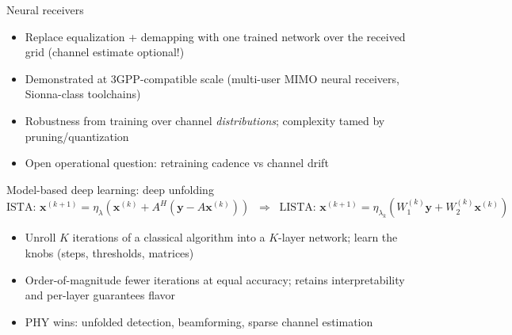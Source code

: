 \begin{frame}{Neural receivers}
  \begin{itemize}\itemsep2pt
    \item Replace equalization + demapping with one trained network over the
          received grid (channel estimate optional!)
    \item Demonstrated at 3GPP-compatible scale (multi-user MIMO neural
          receivers, Sionna-class toolchains)
    \item Robustness from training over channel \emph{distributions};
          complexity tamed by pruning/quantization
    \item Open operational question: retraining cadence vs channel drift
  \end{itemize}
\end{frame}

\begin{frame}{Model-based deep learning: deep unfolding}
  \begin{equation*}
    \text{ISTA: } \mathbf x^{(k+1)}=\eta_{\lambda}\!\left(\mathbf x^{(k)}
      +A^{H}(\mathbf y-A\mathbf x^{(k)})\right)
    \;\;\Rightarrow\;\;
    \text{LISTA: } \mathbf x^{(k+1)}=\eta_{\lambda_k}\!\left(W_1^{(k)}\mathbf y
      +W_2^{(k)}\mathbf x^{(k)}\right)
  \end{equation*}
  \begin{itemize}\itemsep2pt
    \item Unroll $K$ iterations of a classical algorithm into a $K$-layer
          network; \alert{learn the knobs} (steps, thresholds, matrices)
    \item Order-of-magnitude fewer iterations at equal accuracy; retains
          interpretability and per-layer guarantees flavor
    \item PHY wins: unfolded detection, beamforming, sparse channel estimation
  \end{itemize}
\end{frame}

